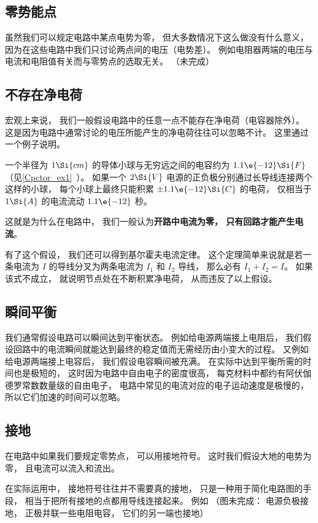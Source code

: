 
\begin{issues}
\issueDraft
\end{issues}


\subsection{零势能点}
虽然我们可以规定电路中某点电势为零， 但大多数情况下这么做没有什么意义， 因为在这些电路中我们只讨论两点间的电压（电势差）。 例如电阻器两端的电压与电流和电阻值有关而与零势点的选取无关。
（未完成）

\subsection{不存在净电荷}
宏观上来说， 我们一般假设电路中的任意一点不能存在净电荷（电容器除外）。 这是因为电路中通常讨论的电压所能产生的净电荷往往可以忽略不计。 这里通过一个例子说明。

\begin{example}{}
一个半径为 $1\Si{cm}$ 的导体小球与无穷远之间的电容约为 $1.1\e{-12} \Si{F}$（见\autoref{Cpctor_ex1}~）。 如果一个 $2\Si{V}$ 电源的正负极分别通过长导线连接两个这样的小球， 每个小球上最终只能积累 $\pm 1.1\e{-12} \Si{C}$ 的电荷， 仅相当于 $1\Si{A}$ 的电流流动 $1.1\e{-12}$ 秒。
\end{example}
这就是为什么在电路中， 我们一般认为\textbf{开路中电流为零， 只有回路才能产生电流}。

有了这个假设， 我们还可以得到基尔霍夫电流定律。 这个定理简单来说就是若一条电流为 $I$ 的导线分叉为两条电流为 $I_1$ 和 $I_2$ 导线， 那么必有 $I_1 + I_2 = I$。 如果该式不成立， 就说明节点处在不断积累净电荷， 从而违反了以上假设。

\subsection{瞬间平衡}
我们通常假设电路可以瞬间达到平衡状态。 例如给电源两端接上电阻后， 我们假设回路中的电流瞬间就能达到最终的稳定值而无需经历由小变大的过程。 又例如给电源两端接上电容后， 我们假设电容瞬间被充满。 在实际中达到平衡所需的时间也是极短的， 这时因为电路中自由电子的密度很高， 每克材料中都约有阿伏伽德罗常数数量级的自由电子， 电路中常见的电流对应的电子运动速度是极慢的， 所以它们加速的时间可以忽略。

\subsection{接地}
在电路中如果我们要规定零势点， 可以用接地符号。 这时我们假设大地的电势为零， 且电流可以流入和流出。

在实际运用中， 接地符号往往并不需要真的接地， 只是一种用于简化电路图的手段， 相当于把所有接地的点都用导线连接起来。 例如
（图未完成： 电源负极接地， 正极并联一些电阻电容， 它们的另一端也接地）
